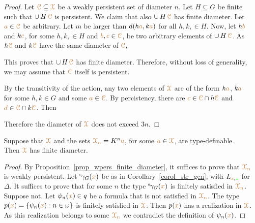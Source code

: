 \begin{proof}
  Let ${\color{brown}\EuScript C}\subseteq{\color{brown}\EuScript X}$ be a weakly persistent set of diameter $n$.
  Let $H\subseteq G$ be finite such that $\cup\,H\,{\color{brown}\EuScript C}$ is persistent.
  We claim that also $\cup\,H\,{\color{brown}\EuScript C}$ has finite diameter.
  Let ${\color{brown} a}\in{\color{brown}\EuScript C}$ be arbitrary.
  Let $m$ be larger than $d(h{\color{brown} a}, k{\color{brown} a})$ for all $h,k,\in H$.
  Now, let $h{\color{brown} b}$ and $k{\color{brown} c}$, for some $h,k,\in H$ and ${\color{brown} b},{\color{brown} c}\in{\color{brown}\EuScript C}$, be two arbitrary elements of $\cup\,H\,{\color{brown}\EuScript C}$.
  As $h{\color{brown}\EuScript C}$ and $k{\color{brown}\EuScript C}$ have the same diameter of ${\color{brown}\EuScript C}$, 



  This proves that $\cup\,H\,{\color{brown}\EuScript C}$ has finite diameter.
  Therefore, without loss of generality, we may assume that ${\color{brown}\EuScript C}$ itself is persistent.
  
  By the transitivity of the action, any two elements of ${\color{brown}\EuScript X}$ are of the form $h{\color{brown} a}$, $k{\color{brown} a}$ for some $h,k\in G$ and some ${\color{brown} a}\in{\color{brown}\EuScript C}$.
  By percistency, there are ${\color{brown} c}\in{\color{brown}\EuScript C}\cap h{\color{brown}\EuScript C}$ and ${\color{brown} d}\in{\color{brown}\EuScript C}\cap k{\color{brown}\EuScript C}$.
  Then 



  Therefore the diameter of ${\color{brown}\EuScript X}$ does not exceed $3n$.
\end{proof}

\begin{theorem}\label{thm_newelski}
  Suppose that ${\color{brown}\EuScript X}$ and the sets ${\color{brown}\EuScript X_n}=K^n{\color{brown} a}$, for some ${\color{brown} a}\in{\color{brown}\EuScript X}$, are type-definable.
  Then ${\color{brown}\EuScript X}$ has finite diameter.
\end{theorem}

\begin{proof}
  By Proposition~\ref{prop_wpers_finite_diameter}, it suffices to prove that ${\color{brown}\EuScript X_n}$ is weakly persistent.
  Let ${}^{\rm s}\kern-.2ex\gamma_G({\color{brown} x})$ be as in Corollary~\ref{corol_str_gen}, with $L_{{\color{brown} x},{\color{green} z}}$ for $\Delta$.
  It suffices to prove that for some $n$ the type ${}^{\rm s}\kern-.2ex\gamma_G({\color{brown} x})$ is finitely satisfied in $\color{brown}\EuScript X_n$.
  Suppose not.
  Let $\psi_n({\color{brown} x})\in q$ be a formula that is not satisfied in $\color{brown}\EuScript X_n$.
  The type $p({\color{brown} x})=\{\psi_n({\color{brown} x}):n\in\omega\}$ is finitely satisfied in ${\color{brown}\EuScript X}$.
  Then $p({\color{brown} x})$ has a realization in ${\color{brown}\EuScript X}$. 
  As this realization belongs to some ${\color{brown}\EuScript X_n}$ we contradict the definition of $\psi_n({\color{brown} x})$. 
\end{proof}

